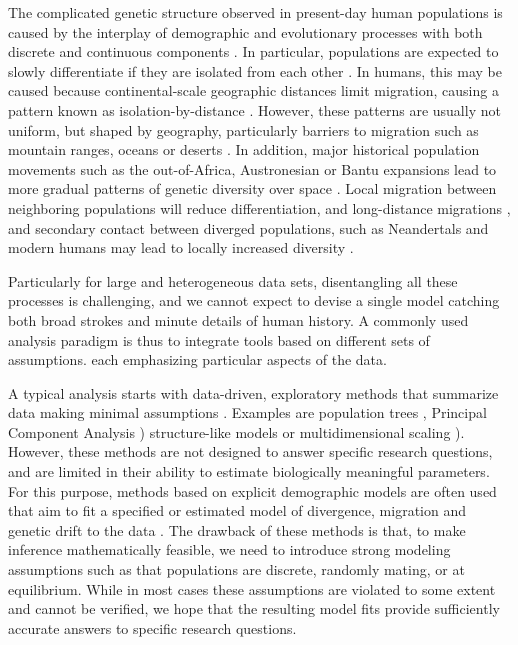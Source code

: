\documentclass[12pt,fullpage, a4paper]{article}
\begin{document}
The complicated genetic structure observed in present-day human populations \citep{the2015, mallick2016} is caused by the interplay of demographic and evolutionary processes with both discrete and continuous components \citep{pritchard2000, rosenberg2002a, serre2004, rosenberg2005, bradburd2018, reich2018a, peter2020a}.
In particular, populations are expected to slowly differentiate if they are isolated from each other \citep{wahlund1928,cavalli-sforza1975}. In humans, this may be caused because continental-scale geographic distances limit migration, causing a pattern known as isolation-by-distance \citep{slatkin1985a}. However, these patterns are usually not uniform, but shaped by geography, particularly barriers  to migration such as mountain ranges, oceans or deserts \citep{cavalli-sforza1994, barbujani1990, rosenberg2005, bradburd2013, peter2020a}. In addition,  major historical population movements such as the out-of-Africa, Austronesian or Bantu expansions lead to more gradual patterns of genetic diversity over space \citep{cavalli-sforza1994, ramachandran2005, novembre2008, stoneking2016, racimo2020}. Local migration between neighboring populations will reduce differentiation, and long-distance migrations \citep{alves2016}, and secondary contact between diverged populations, such as Neandertals and modern humans \citep{green2010} may lead to locally increased diversity \citep{skov2019}.

Particularly for large and heterogeneous data sets, disentangling all these processes is challenging, and we cannot expect to devise a single model catching both broad strokes and minute details of human history. A commonly used analysis paradigm is thus to integrate tools based on different sets of assumptions. each emphasizing particular aspects of the data.

A typical analysis starts with data-driven, exploratory methods that summarize data making minimal assumptions \citep[e.g.][]{schraiber2015}. Examples are population trees \citep{cavalli-sforza1967, felsenstein1973, cavalli-sforza1975}, Principal Component Analysis \citep[PCA, ][]{cavalli-sforza1994, patterson2006}) structure-like models \citep{pritchard2000, alexander2009} or multidimensional scaling \citep[MDS][]{lessa1990}). However, these methods are not designed to answer specific research questions, and are limited in their ability to estimate biologically meaningful parameters. For this purpose, methods based on explicit demographic models are often used that aim to fit a specified or estimated model of divergence, migration and genetic drift to the data \citep{gutenkunst2009, excoffier2013, kamm2015}. The drawback of these methods is that, to make inference mathematically feasible, we need to introduce strong modeling assumptions such as that populations are discrete, randomly mating, or at equilibrium. While in most cases these assumptions are violated to some extent and cannot be verified, we hope that the resulting model fits provide sufficiently accurate answers to specific research questions.
\end{document}
